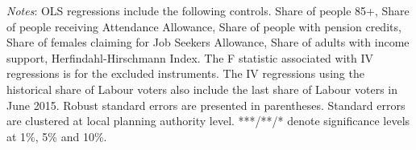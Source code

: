 \documentclass[12pt,letterpaper]{article}
\begin{document}
\begin{table}[h!]
{\begin{tabular}{@{}lccccccccc@{}}
\end{tabular}}
\begin{tablenotes}
      \scriptsize
      \item {\it{Notes}}: OLS regressions include the following controls. Share of people 85+, 
      Share of people receiving Attendance Allowance, Share of people with pension credits, 
      Share of females claiming for Job Seekers Allowance, Share of adults with income 
      support, 
      Herfindahl-Hirschmann Index. The F statistic associated with IV regressions is for the excluded instruments. 
      The IV regressions using the historical share of Labour voters
      also include the last share of Labour voters in June 2015. Robust standard errors are presented in parentheses.
       Standard errors are clustered at local planning 
      authority level. ***/**/* denote significance levels at 1\%, 5\% and 
      10\%. 
    \end{tablenotes}
\end{table}

\newpage
\end{document}
